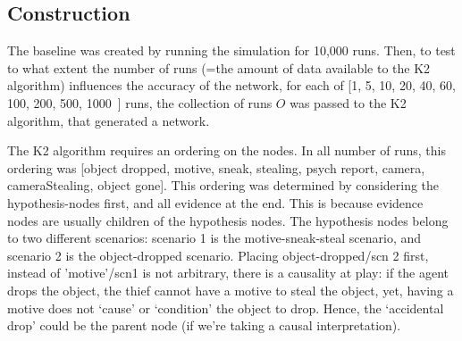 \documentclass[12pt]{article}
\begin{document}
\subsection{Construction}
The baseline was created by running the simulation for 10,000 runs. Then, to test to what extent the number of runs (=the amount of data available to the K2 algorithm) influences the accuracy of the network, for each of [1, 5, 10, 20, 40, 60, 100, 200, 500, 1000~] runs, the collection of runs $O$ was passed to the K2 algorithm, that generated a network.

The K2 algorithm requires an ordering on the nodes. In all number of runs, this ordering was 
[object dropped, motive, sneak, stealing, psych report, camera, cameraStealing, object gone]. This ordering was determined by considering the hypothesis-nodes first, and all evidence at the end. This is because evidence nodes are usually children of the hypothesis nodes. The hypothesis nodes belong to two different scenarios: scenario 1 is the motive-sneak-steal scenario, and scenario 2 is the object-dropped scenario. Placing object-dropped/scn 2 first, instead of 'motive'/scn1 is not arbitrary, there is a causality at play: if the agent drops the object, the thief cannot have a motive to steal the object, yet, having a motive does not `cause' or `condition' the object to drop. Hence, the `accidental drop' could be the parent node (if we're taking a causal interpretation).
 
\end{document}
